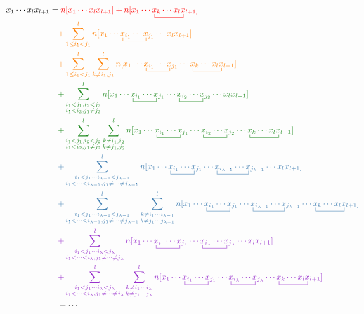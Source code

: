 \documentclass{article}
\newcommand{\ctr}{\bcontraction}
\newcommand{\cd}{\ensuremath{\cdots} }
\def\cb#1{{\color{blue}#1}}
\def\co#1{{\color{orange}#1}}
\def\cre#1{{\color{red}#1}}
\def\cg#1{{\color{green}#1}}
\def\cp#1{{\color{purple}#1}}
\begin{document}
\begin{align*}
x_1 \cd x_l x_{l + 1} 
&= \cre{n[x_1 \cd x_l  x_{l + 1} ] + n[x_1 \cd \ctr{}{x}{{}_k \cd x_l }{x} x_k \cd x_l  x_{l + 1} ]} \\
& \quad \co{ + \sum_{1 \leq i_1 <  j_1}^l n[x_1 \cd \ctr{}{x}{{}_{i_1}\cd}{x} x_{i_1}  \cd x_{j_1}  \cd x_l x_{l + 1}]  }\\
& \quad \co{ + \sum_{1 \leq i_1 <  j_1}^l \sum_{k \neq i_1, j_1}^l n[x_1 \cd \ctr{}{x}{{}_{i_1}\cd}{x} x_{i_1}  \cd x_{j_1}  \cd \ctr{}{x}{{}_k \cd  x_l}{x} x_k \cd  x_l x_{l + 1}]  } \\
& \quad \cg{ +\sum_{\substack{i_1 < j_1,  i_2 < j_2 \\ i_1 < i_2, j_1 \neq j_2}}^l
n[x_1 \cd \ctr{}{x}{{}_{i_1}\cd}{x} x_{i_1}  \cd x_{j_1} \cd \ctr{}{x}{{}_{i_2}\cd}{x} x_{i_2}  \cd x_{j_2} \cd x_l x_{l + 1}  ] }   \\
& \quad \cg{ + \sum_{\substack{i_1 < j_1,  i_2 < j_2 \\ i_1 < i_2, j_1 \neq j_2}}^l \sum_{\substack{k\neq i_1, i_2 \\ k\neq j_1, j_2} }^{l}
n[x_1 \cd \ctr{}{x}{{}_{i_1}\cd}{x} x_{i_1}  \cd x_{j_1} \cd \ctr{}{x}{{}_{i_2}\cd}{x} x_{i_2}  \cd x_{j_2} \cd \ctr{}{x}{{}_k \cd  x_l}{x}  x_k \cd x_l x_{l + 1}  ] }   \\
& \quad \cb{ +  \sum_{\substack{i_1 <  j_1 \cd  i_{\lambda - 1} < j_{\lambda - 1} \\ i_1 < \cd < i_{\lambda - 1}, j_1 \neq \cd \neq j_{\lambda-1}}}^l
n[x_1 \cd \ctr{}{x}{{}_{i_1}\cd}{x} x_{i_1}  \cd x_{j_1} \cd \ctr{}{x}{{}_{i_{\lambda -1} }\cd}{x} x_{i_{\lambda-1}}  \cd x_{j_{\lambda - 1}} \cd x_l x_{l + 1} ]  } \\
& \quad \cb{ + \sum_{\substack{i_1 <  j_1 \cd  i_{\lambda - 1} < j_{\lambda - 1} \\ i_1 < \cd < i_{\lambda - 1}, j_1 \neq \cd \neq j_{\lambda-1}}}^l
\sum_{\substack{k\neq i_1 \cd i_{\lambda-1} \\ k\neq j_1\cd j_{\lambda - 1}} }^{l}
n[x_1 \cd \ctr{}{x}{{}_{i_1}\cd}{x} x_{i_1}  \cd x_{j_1} \cd \ctr{}{x}{{}_{i_{\lambda -1} }\cd}{x} x_{i_{\lambda-1}}  \cd x_{j_{\lambda - 1}} \cd \ctr{}{x}{{}_k \cd  x_l}{x}  x_k \cd x_l x_{l + 1} ]  } \\
& \quad \cp{ +  \sum_{\substack{i_1 <  j_1 \cd  i_{\lambda } < j_{\lambda } \\ i_1 < \cd < i_{\lambda }, j_1 \neq \cd \neq j_{\lambda}}}^l
n[x_1 \cd \ctr{}{x}{{}_{i_1}\cd}{x} x_{i_1}  \cd x_{j_1} \cd \ctr{}{x}{{}_{i_{\lambda} }\cd}{x} x_{i_{\lambda}}  \cd x_{j_{\lambda }} \cd x_l x_{l + 1} ]  } \\
& \quad \cp{ + \sum_{\substack{i_1 <  j_1 \cd  i_{\lambda } < j_{\lambda } \\ i_1 < \cd < i_{\lambda }, j_1 \neq \cd \neq j_{\lambda}}}^l
\sum_{\substack{k\neq i_1 \cd i_{\lambda} \\ k\neq j_1\cd j_{\lambda }} }^{l}
n[x_1 \cd \ctr{}{x}{{}_{i_1}\cd}{x} x_{i_1}  \cd x_{j_1} \cd \ctr{}{x}{{}_{i_{\lambda } }\cd}{x} x_{i_{\lambda}}  \cd x_{j_{\lambda }} \cd \ctr{}{x}{{}_k \cd  x_l}{x}  x_k \cd x_l x_{l + 1} ]  } \\
& \quad + \cd
\end{align*}
\end{document}
